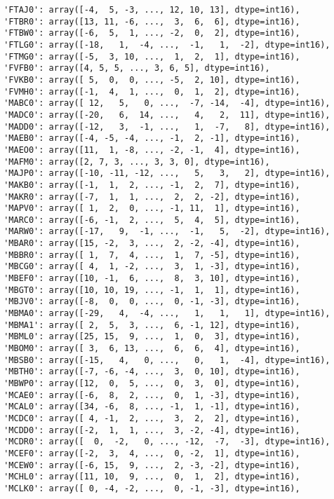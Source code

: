 \documentclass[11pt]{article}
\begin{document}
\begin{verbatim}
 'FTAJ0': array([-4,  5, -3, ..., 12, 10, 13], dtype=int16),
 'FTBR0': array([13, 11, -6, ...,  3,  6,  6], dtype=int16),
 'FTBW0': array([-6,  5,  1, ..., -2,  0,  2], dtype=int16),
 'FTLG0': array([-18,   1,  -4, ...,  -1,   1,  -2], dtype=int16),
 'FTMG0': array([-5,  3, 10, ...,  1,  2,  1], dtype=int16),
 'FVFB0': array([4, 5, 5, ..., 3, 6, 5], dtype=int16),
 'FVKB0': array([ 5,  0,  0, ..., -5,  2, 10], dtype=int16),
 'FVMH0': array([-1,  4,  1, ...,  0,  1,  2], dtype=int16),
 'MABC0': array([ 12,   5,   0, ...,  -7, -14,  -4], dtype=int16),
 'MADC0': array([-20,   6,  14, ...,   4,   2,  11], dtype=int16),
 'MADD0': array([-12,   3,  -1, ...,   1,  -7,   8], dtype=int16),
 'MAEB0': array([-4, -5, -4, ..., -1,  2, -1], dtype=int16),
 'MAEO0': array([11,  1, -8, ..., -2, -1,  4], dtype=int16),
 'MAFM0': array([2, 7, 3, ..., 3, 3, 0], dtype=int16),
 'MAJP0': array([-10, -11, -12, ...,   5,   3,   2], dtype=int16),
 'MAKB0': array([-1,  1,  2, ..., -1,  2,  7], dtype=int16),
 'MAKR0': array([-7,  1,  1, ...,  2,  2, -2], dtype=int16),
 'MAPV0': array([ 1,  2,  0, ..., -1, 11,  1], dtype=int16),
 'MARC0': array([-6, -1,  2, ...,  5,  4,  5], dtype=int16),
 'MARW0': array([-17,   9,  -1, ...,  -1,   5,  -2], dtype=int16),
 'MBAR0': array([15, -2,  3, ...,  2, -2, -4], dtype=int16),
 'MBBR0': array([ 1,  7,  4, ...,  1,  7, -5], dtype=int16),
 'MBCG0': array([ 4,  1, -2, ...,  3,  1, -3], dtype=int16),
 'MBEF0': array([10, -1,  6, ...,  8,  3, 10], dtype=int16),
 'MBGT0': array([10, 10, 19, ..., -1,  1,  1], dtype=int16),
 'MBJV0': array([-8,  0,  0, ...,  0, -1, -3], dtype=int16),
 'MBMA0': array([-29,   4,  -4, ...,   1,   1,   1], dtype=int16),
 'MBMA1': array([ 2,  5,  3, ...,  6, -1, 12], dtype=int16),
 'MBML0': array([25, 15,  9, ...,  1,  0,  3], dtype=int16),
 'MBOM0': array([ 3,  6, 13, ...,  6,  6,  4], dtype=int16),
 'MBSB0': array([-15,   4,   0, ...,   0,   1,  -4], dtype=int16),
 'MBTH0': array([-7, -6, -4, ...,  3,  0, 10], dtype=int16),
 'MBWP0': array([12,  0,  5, ...,  0,  3,  0], dtype=int16),
 'MCAE0': array([-6,  8,  2, ...,  0,  1, -3], dtype=int16),
 'MCAL0': array([34, -6,  8, ..., -1,  1, -1], dtype=int16),
 'MCDC0': array([ 4, -1,  2, ...,  3,  2,  2], dtype=int16),
 'MCDD0': array([-2,  1,  1, ...,  3, -2, -4], dtype=int16),
 'MCDR0': array([  0,  -2,   0, ..., -12,  -7,  -3], dtype=int16),
 'MCEF0': array([-2,  3,  4, ...,  0, -2,  1], dtype=int16),
 'MCEW0': array([-6, 15,  9, ...,  2, -3, -2], dtype=int16),
 'MCHL0': array([11, 10,  9, ...,  0,  1,  2], dtype=int16),
 'MCLK0': array([ 0, -4, -2, ...,  0, -1, -3], dtype=int16),

\end{verbatim}
\end{document}
